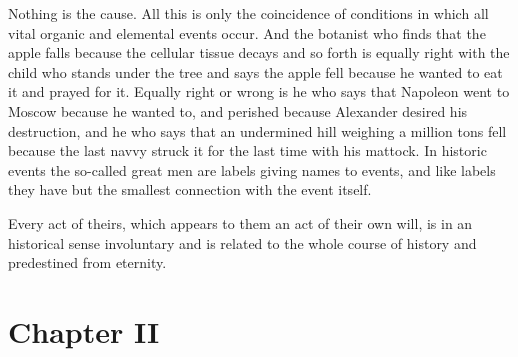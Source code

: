 Nothing is the cause. All this is only the coincidence of
conditions in which all vital organic and elemental events
occur. And the botanist who finds that the apple falls because
the cellular tissue decays and so forth is equally right with the
child who stands under the tree and says the apple fell because
he wanted to eat it and prayed for it. Equally right or wrong is
he who says that Napoleon went to Moscow because he wanted to,
and perished because Alexander desired his destruction, and he
who says that an undermined hill weighing a million tons fell
because the last navvy struck it for the last time with his
mattock. In historic events the so-called great men are labels
giving names to events, and like labels they have but the
smallest connection with the event itself.

Every act of theirs, which appears to them an act of their own
will, is in an historical sense involuntary and is related to the
whole course of history and predestined from eternity.


\chapter*{Chapter II}
\ifaudio     
{} 
\fi

